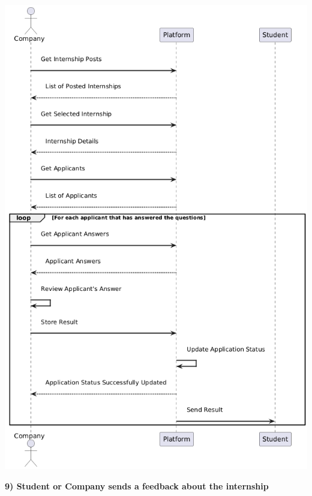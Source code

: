 \begin{center}
    \includegraphics[scale = 0.70]{Images/ImagesRASD/Company_questions_reviewing.png}
\end{center}
\newpage

\textbf{9) Student or Company sends a feedback about the internship}\\


